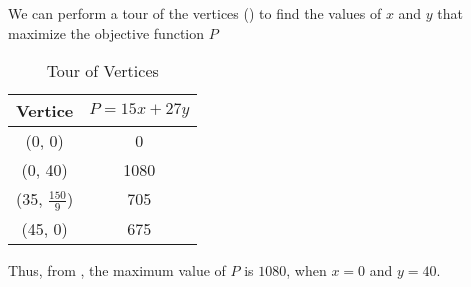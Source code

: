 \begin{subquestions}
\begin{center}
\end{center}


\subquestion

We can perform a tour of the vertices () to find the values of $x$ and $y$ that maximize the objective function $P$

\begin{table}[H]
	\centering
	\begin{tabular}{|c|c|}
		\hline
		Vertice & $P = 15x + 27y$ \\
		\hline
		(0, 0) & 0 \\
		(0, 40) & 1080 \\
		(35, $\frac{150}{9}$) & 705 \\
		(45, 0) & 675 \\
		\hline
	\end{tabular}
	\caption{\label{2008:q1:tab:Profit} Tour of Vertices}
\end{table}

Thus, from , the maximum value of $P$ is $1080$, when $x = 0$ and $y = 40$.

\end{subquestions}

